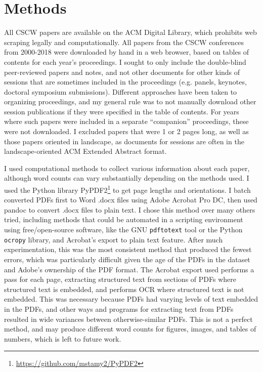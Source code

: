 \documentclass[format=acmsmall, screen=true]{acmart}
\begin{document}
\section{Methods}
All CSCW papers are available on the ACM Digital Library, which prohibits web scraping legally and computationally. All papers from the CSCW conferences from 2000-2018 were downloaded by hand in a web browser, based on tables of contents for each year's proceedings. I sought to only include the double-blind peer-reviewed papers and notes, and not other documents for other kinds of sessions that are sometimes included in the proceedings (e.g. panels, keynotes, doctoral symposium submissions). Different approaches have been taken to organizing proceedings, and my general rule was to not manually download other session publications if they were specified in the table of contents. For years where such papers were included in a separate ``companion'' proceedings, these were not downloaded. I excluded papers that were 1 or 2 pages long, as well as those papers oriented in landscape, as documents for sessions are often in the landscape-oriented ACM Extended Abstract format.

I used computational methods to collect various information about each paper, although word counts can vary substantially depending on the methods used. I used the Python \cite{python} library PyPDF2\footnote{\url{https://github.com/mstamy2/PyPDF2}} to get page lengths and orientations. I batch converted PDFs first to Word .docx files using Adobe Acrobat Pro DC, then used pandoc \cite{pandoc} to convert .docx files to plain text. I chose this method over many others tried, including methods that could be automated in a scripting environment using free/open-source software, like the GNU \texttt{pdftotext} tool or the Python \texttt{ocropy} library, and Acrobat's export to plain text feature. After much experimentation, this was the most consistent method that produced the fewest errors, which was particularly difficult given the age of the PDFs in the dataset and Adobe's ownership of the PDF format. The Acrobat export used performs a pass for each page, extracting structured text from sections of PDFs where structured text is embedded, and performs OCR where structured text is not embedded. This was necessary because PDFs had varying levels of text embedded in the PDFs, and other ways and programs for extracting text from PDFs resulted in wide variances between otherwise-similar PDFs. This is not a perfect method, and may produce different word counts for figures, images, and tables of numbers, which is left to future work.
\end{document}
